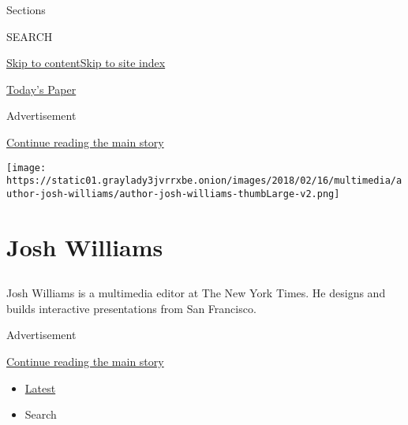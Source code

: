 Sections

SEARCH

\protect\hyperlink{site-content}{Skip to
content}\protect\hyperlink{site-index}{Skip to site index}

\href{https://myaccount.nytimes3xbfgragh.onion/auth/login?response_type=cookie\&client_id=vi}{}

\href{https://www.nytimes3xbfgragh.onion/section/todayspaper}{Today's
Paper}

Advertisement

\protect\hyperlink{after-top}{Continue reading the main story}

\texttt{[image: https://static01.graylady3jvrrxbe.onion/images/2018/02/16/multimedia/author-josh-williams/author-josh-williams-thumbLarge-v2.png]}

\hypertarget{josh-williams}{%
\section{Josh Williams}\label{josh-williams}}

\subsection{}

Josh Williams is a multimedia editor at The New York Times. He designs
and builds interactive presentations from San Francisco.

Advertisement

\protect\hyperlink{after-mid1}{Continue reading the main story}

\begin{itemize}
\tightlist
\item
  \protect\hyperlink{stream-panel}{Latest}
\item
  Search
\end{itemize}

